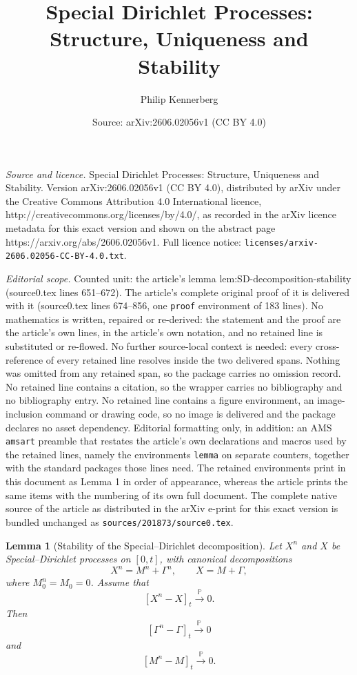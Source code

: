 \documentclass[10pt,a4paper]{amsart}
\title{Special Dirichlet Processes: Structure, Uniqueness and Stability}
\author{Philip Kennerberg}
\date{Source: arXiv:2606.02056v1 (CC BY 4.0)}
\newtheorem{lemma}{Lemma}
\begin{document}
\maketitle

\noindent\emph{Source and licence.} Special Dirichlet Processes: Structure, Uniqueness and Stability. Version arXiv:2606.02056v1 (CC BY 4.0), distributed by arXiv under the Creative Commons Attribution 4.0 International licence, http://creativecommons.org/licenses/by/4.0/, as recorded in the arXiv licence metadata for this exact version and shown on the abstract page https://arxiv.org/abs/2606.02056v1. Full licence notice: \texttt{licenses/arxiv-2606.02056-CC-BY-4.0.txt}.\par\smallskip

\noindent\textit{Editorial scope.} Counted unit: the article's lemma lem:SD-decomposition-stability (source0.tex lines 651--672). The article's complete original proof of it is delivered with it (source0.tex lines 674--856, one \texttt{proof} environment of 183 lines). No mathematics is written, repaired or re-derived: the statement and the proof are the article's own lines, in the article's own notation, and no retained line is substituted or re-flowed.  No further source-local context is needed: every cross-reference of every retained line resolves inside the two delivered spans.  Nothing was omitted from any retained span, so the package carries no omission record.  No retained line contains a citation, so the wrapper carries no bibliography and no bibliography entry.  No retained line contains a figure environment, an image-inclusion command or drawing code, so no image is delivered and the package declares no asset dependency.  Editorial formatting only, in addition: an AMS \texttt{amsart} preamble that restates the article's own declarations and macros used by the retained lines, namely the environments \texttt{lemma} on separate counters, together with the standard packages those lines need.  The retained environments print in this document as Lemma 1 in order of appearance, whereas the article prints the same items with the numbering of its own full document.  The complete native source of the article as distributed in the arXiv e-print for this exact version is bundled unchanged as \texttt{sources/201873/source0.tex}.
\begin{lemma}[Stability of the Special--Dirichlet decomposition]
\label{lem:SD-decomposition-stability}
Let \(X^n\) and \(X\) be Special--Dirichlet processes on \([0,t]\), with
canonical decompositions
\[
        X^n=M^n+\Gamma^n,
        \qquad
        X=M+\Gamma,
\]
where \(M^n_0=M_0=0\). Assume that
\[
        [X^n-X]_t \xrightarrow{\mathbb P} 0 .
\]
Then
\[
        [\Gamma^n-\Gamma]_t \xrightarrow{\mathbb P} 0
\]
and
\[
        [M^n-M]_t \xrightarrow{\mathbb P} 0 .
\]
\end{lemma}
\end{document}
